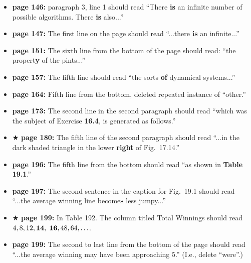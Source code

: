 \documentclass[12pt]{article}
\begin{document}
\begin{itemize}
  \item {\bf page 146:} paragraph 3, line 1 should read ``There {\bf
    is} an infinite number of possible algorithms.  There {\bf is}
    also...'' %

  \item {\bf page 147:} The first line on the page should read
    ``...there {\bf is} an infinite...''

  \item {\bf page 151:} The sixth line from the bottom of the page
    should read: ``the propert{\bf y} of the pints...''

  \item {\bf page 157:}  The fifth line should read ``the sorts {\bf
    of} dynamical systems...'' 

  \item {\bf page 164:}  Fifth line from the bottom, deleted repeated
    instance of ``other.'' %

  \item {\bf page 173:}  The second line in the second paragraph
    should read ``which was the subject of Exercise {\bf 16.4}, is
    generated as follows.''  %

  \item $\bigstar$ {\bf page 180:}  The fifth line of the second
  paragraph should read ``...in the dark shaded triangle in the lower
  {\bf right} of Fig.~17.14.'' 

  \item {\bf page 196:}  The fifth line from the bottom should read
    ``as shown in {\bf Table 19.1}.''  

  \item {\bf page 197:}  The second sentence in the caption for
    Fig.~19.1 should read ``...the average winning line become{\bf s}
    less jumpy...'' %

  \item $\bigstar$ {\bf page 199:}  In Table 192.  The column titled
    Total Winnings should read $4, 8, 12, {\bf 14},$ $ {\bf 16}, 48, 64,
    \ldots$.  

  \item {\bf page 199:}  The second to last line from the bottom of
    the page should read ``...the average winning may have been
    approaching $5$.''  (I.e., delete ``were''.)  %


\end{itemize}
\end{document}

